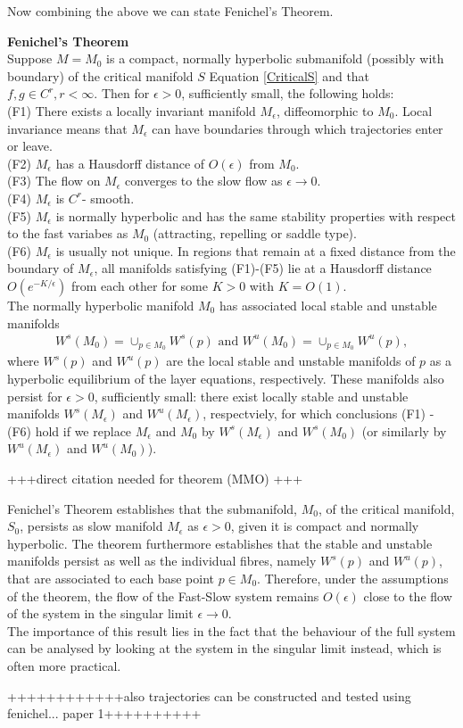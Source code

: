 Now combining the above we can state Fenichel's Theorem.
\begin{theorem}{\textbf{Fenichel's Theorem}} \label{Fenichel}
	\\
	Suppose $M=M_0$ is a compact, normally hyperbolic submanifold  (possibly with boundary) of the critical manifold $S$ Equation \ref{CriticalS} and  that $f, g \in C^r, r < \infty $. Then for $\epsilon >0$, sufficiently small, the following holds:\\
	(F1) There exists a locally invariant manifold $M_{\epsilon}$, diffeomorphic to  $M_0$. Local invariance means that $M_{\epsilon}$ can have boundaries through which trajectories enter or leave.\\
	(F2) $M_{\epsilon}$ has a Hausdorff distance of $O(\epsilon)$ from $M_0$.\\
	(F3) The flow on $M_{\epsilon}$  converges to the slow flow as $\epsilon \to 0$.\\
	(F4) $M_{\epsilon}$ is $C^r$- smooth.\\
	(F5) $M_{\epsilon}$ is normally hyperbolic and has the same stability properties with respect to the fast variabes as $M_0$ (attracting, repelling or saddle type).\\
	(F6) $M_{\epsilon}$ is usually not unique. In regions that remain at a fixed distance from the boundary of  $M_{\epsilon}$, all manifolds satisfying (F1)-(F5) lie at a Hausdorff distance $O(e^{-K/\epsilon})$ from each other for some $K>0$ with $K=O(1)$.\\
	The normally hyperbolic manifold $M_0$ has associated local stable and unstable manifolds
	\begin{align*}
	W^s(M_0) =\cup_{p \in M_0} W^s(p) \textrm{\ \ and\ \ } W^u(M_0) =\cup_{p \in M_0} W^u(p),
	\end{align*}
	where  $W^s(p)$ and $W^u(p)$ are the local stable and unstable manifolds of $p$ as a hyperbolic equilibrium of the layer equations, respectively. These manifolds also persist for $\epsilon > 0$, sufficiently small: there exist locally stable and unstable manifolds $W^s(M_\epsilon)$ and $W^u(M_\epsilon)$, respectviely, for which conclusions (F1) - (F6) hold if we replace $M_\epsilon$ and $M_0$ by  $W^s(M_\epsilon)$ and $W^s(M_0)$ (or similarly by  $W^u(M_\epsilon)$ and $W^u(M_0)$).
\end{theorem} +++direct citation needed for theorem (MMO) +++

Fenichel's Theorem establishes that the submanifold, $M_0$, of the critical manifold, $S_0$, persists as slow manifold $M_\epsilon$ as $\epsilon >0$, given it is compact and normally hyperbolic. The theorem furthermore establishes that the stable and unstable manifolds persist as well as the individual fibres, namely $W^s(p)$ and $W^u(p)$, that are associated to each base point $p \in M_0$.
Therefore, under the assumptions of the theorem, the flow of the Fast-Slow system remains $O(\epsilon)$ close to the flow of the system in the singular limit $\epsilon \to 0$.\\

The importance of this result lies in the fact that the behaviour of the full system can be analysed by looking at the system in the singular limit instead, which is often more practical.


++++++++++++also trajectories can be constructed and tested using fenichel... paper 1++++++++++


